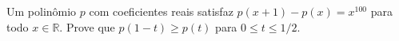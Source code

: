 Um polinômio \(p\) com coeficientes reais satisfaz \(p(x+1)-p(x)=x^{100}\) para todo \(x \in \mathbb{R}.\) Prove que \(p(1-t) \ge p(t)\) para \(0 \le t \le 1/2.\)
